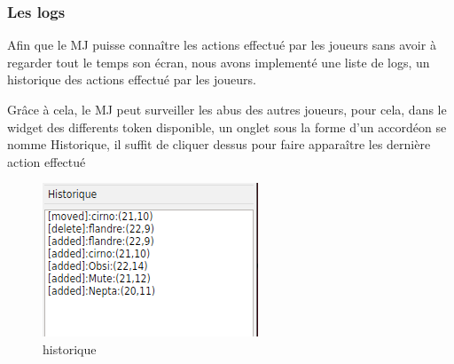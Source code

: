 \subsubsection{Les logs}

Afin que le MJ puisse connaître les actions effectué par les joueurs sans avoir à regarder tout le temps son écran, nous avons implementé une  liste de logs, un historique des actions effectué par les joueurs.

Grâce à cela, le MJ peut surveiller les abus des autres joueurs, pour cela, dans le widget des differents token disponible, un onglet sous la forme d'un accordéon se nomme \og Historique\fg{}, il suffit de cliquer dessus pour faire apparaître les dernière action effectué

\begin{figure}[h!]
    \centering
    \includegraphics[scale=0.7]{img/log.png}
    \caption{historique}
    \label{fig:log}
\end{figure}